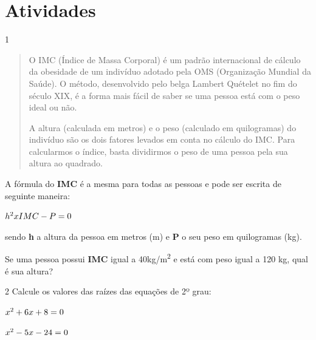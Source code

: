 \section*{Atividades}

\num{1} 

\begin{quote}
O IMC (Índice de Massa Corporal) é um padrão internacional de cálculo
da obesidade de um indivíduo adotado pela OMS (Organização Mundial da
Saúde). O método, desenvolvido pelo belga Lambert Quételet no fim do
século XIX, é a forma mais fácil de saber se uma pessoa está com o peso
ideal ou não.

A altura (calculada em metros) e o peso (calculado em quilogramas) do
indivíduo são os dois fatores levados em conta no cálculo do IMC. Para
calcularmos o índice, basta dividirmos o peso de uma pessoa pela sua
altura ao quadrado.

\end{quote}

A fórmula do \textbf{IMC} é a mesma para todas as pessoas e pode ser
escrita de seguinte maneira:

$h\textsuperscript{2} x IMC - P = 0$

sendo \textbf{h} a altura da pessoa em metros (m) e \textbf{P} o seu peso 
em quilogramas (kg).

Se uma pessoa possui \textbf{IMC} igual a 40kg/m\textsuperscript{2} e está
com peso igual a 120 kg, qual é sua altura?

\begin{emptybox}



\vspace{3.5cm}
\end{emptybox}

\num{2} Calcule os valores das raízes das equações de 2º grau:

\begin{escolha}
  \item $x\textsuperscript{2} + 6x + 8 = 0$\\

  \item $x\textsuperscript{2} - 5x - 24 = 0$\\
\end{escolha}

